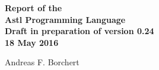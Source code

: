 \begin{titlepage}
   \begin{flushright}
      {\Huge \bfseries
	 Report of the \\
	 Astl Programming Language \\
	 Draft in preparation of version 0.24 \\
	 18 May 2016 \\
      }

      \vspace*{\fill}

      {\huge
	 Andreas F. Borchert \\
      }
   \end{flushright}
\end{titlepage}
